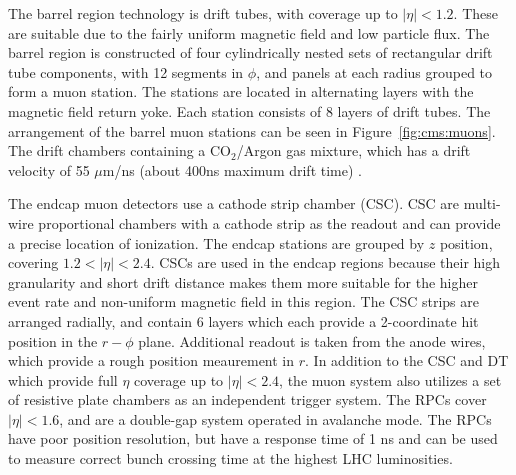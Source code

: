 The barrel region technology is drift tubes, with coverage up to $|\eta| < 1.2$. These are suitable due to the fairly uniform magnetic field and low particle flux. The barrel region is constructed of four cylindrically nested sets of rectangular drift tube components, with 12 segments in $\phi$, and panels at each radius grouped to form a muon station. The stations are located in alternating layers with the magnetic field return yoke. Each station consists of 8 layers of drift tubes. The arrangement of the barrel muon stations can be seen in Figure~\ref{fig:cms:muons}. The drift chambers containing a $\mathrm{CO_2}$/Argon gas mixture, which has a drift velocity of 55 $\mu$m/ns (about 400ns maximum drift time) \cite{Chatrchyan:2013sba}.



The endcap muon detectors use a cathode strip chamber (CSC). CSC are multi-wire proportional chambers with a cathode strip as the readout and can provide a precise location of ionization. The endcap stations are grouped by $z$ position, covering $1.2 < |\eta| < 2.4$. CSCs are used in the endcap regions because their high granularity and short drift distance makes them more suitable for the higher event rate and non-uniform magnetic field in this region. The CSC strips are arranged radially, and contain 6 layers which each provide a 2-coordinate hit position in the $r-\phi$ plane. Additional readout is taken from the anode wires, which provide a rough position meaurement in $r$.
In addition to the CSC and DT which provide full $\eta$ coverage up to $|\eta| < 2.4$, the muon system also utilizes a set of resistive plate chambers as an independent trigger system. The RPCs cover $|\eta| < 1.6$, and are a double-gap system operated in avalanche mode. The RPCs have poor position resolution, but have a response time of 1 ns and can be used to measure correct bunch crossing time at the highest LHC luminosities. 
